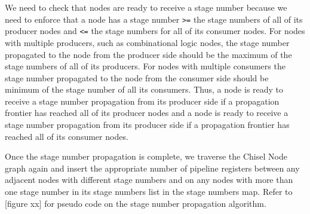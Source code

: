 We need to check that nodes are ready to receive a stage number
because we need to enforce that a node has a stage number {\tt >=} the
stage numbers of all of its producer nodes and {\tt <=} the stage
numbers for all of its consumer nodes. For nodes with multiple
producers, such as combinational logic nodes, the stage number
propagated to the node from the producer side should be the maximum of
the stage numbers of all of its producers. For nodes with multiple
consumers the stage number propagated to the node from the consumer
side should be minimum of the stage number of all its consumers. Thus,
a node is ready to receive a stage number propagation from its
producer side if a propagation frontier has reached all of its
producer nodes and a node is ready to receive a stage number
propagation from its producer side if a propagation frontier has
reached all of its consumer nodes. 

Once the stage number propagation is complete, we traverse the Chisel
Node graph again and insert the appropriate number of pipeline
registers between any adjacent nodes with different stage numbers and
on any nodes with more than one stage number in its stage numbers list
in the stage numbers map. Refer to [figure xx] for pseudo code on the
stage number propagation algorithm. 

